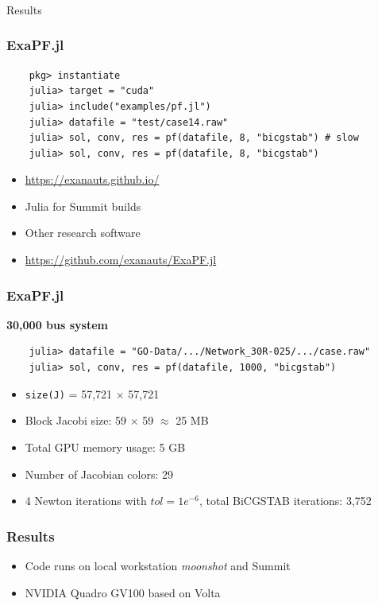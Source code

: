 \begin{frame}
  \frametitle{}
  \centering
  {\Huge Results}
\end{frame}

\begin{frame}[fragile]
  \frametitle{ExaPF.jl}
  \begin{lstlisting}
    pkg> instantiate
    julia> target = "cuda" 
    julia> include("examples/pf.jl") 
    julia> datafile = "test/case14.raw"
    julia> sol, conv, res = pf(datafile, 8, "bicgstab") # slow
    julia> sol, conv, res = pf(datafile, 8, "bicgstab")
  \end{lstlisting}
  \begin{itemize}
    \item \url{https://exanauts.github.io/}
    \item Julia for Summit builds
    \item Other research software
    \item \url{https://github.com/exanauts/ExaPF.jl}
  \end{itemize}
\end{frame}

\begin{frame}[fragile]
  \frametitle{ExaPF.jl}
  {\bf 30,000 bus system}
  \begin{lstlisting}
    julia> datafile = "GO-Data/.../Network_30R-025/.../case.raw"
    julia> sol, conv, res = pf(datafile, 1000, "bicgstab")
  \end{lstlisting}
  \begin{itemize}
    \item \lstinline{size(J)} = 57,721 $\times$ 57,721 
    \item Block Jacobi size: 59 $\times$ 59 $\approx$ 25 MB
    \item Total GPU memory usage: 5 GB
    \item Number of Jacobian colors: 29
    \item 4 Newton iterations with $tol = 1e^{-6}$, total BiCGSTAB iterations: 3,752 
  \end{itemize}
\end{frame}

\begin{frame}
  \frametitle{Results}
  \begin{itemize}
    \item Code runs on local workstation {\it moonshot} and Summit
    \item NVIDIA Quadro GV100 based on Volta 
  \end{itemize}
\end{frame}

